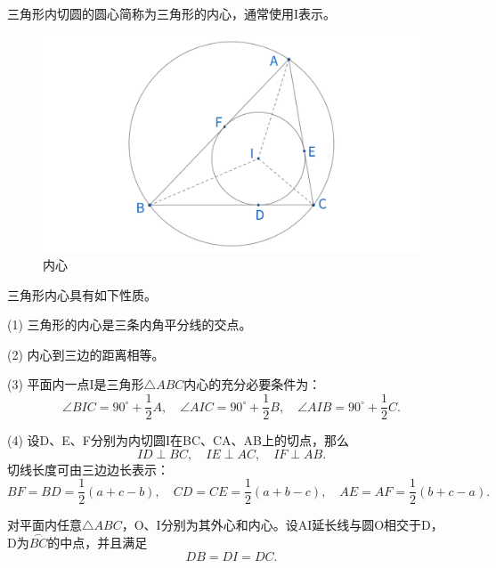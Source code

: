 \begin{definition}[内心]
    三角形内切圆的圆心简称为三角形的内心，通常使用I表示。
\end{definition}

\begin{figure}[H]
    \centering
    \includegraphics[width=0.8\linewidth]{figures/三角形五心/内心.png}
    \caption{内心}
\end{figure}

\begin{proposition}[内心性质]
    三角形内心具有如下性质。
    
    (1) 三角形的内心是三条内角平分线的交点。

    (2) 内心到三边的距离相等。

    (3) 平面内一点I是三角形$\triangle ABC$内心的充分必要条件为：
    $$\angle BIC = 90^\circ +\frac{1}{2}A,\quad \angle AIC = 90^\circ +\frac{1}{2}B,
    \quad \angle AIB =90^\circ +\frac{1}{2}C.$$

    (4) 设D、E、F分别为内切圆I在BC、CA、AB上的切点，那么
    $$
    ID \perp BC,\quad 
    IE \perp AC, \quad 
    IF \perp AB.$$
    切线长度可由三边边长表示：
    $$
    BF=BD=\frac{1}{2}(a+c - b),\quad 
    CD=CE=\frac{1}{2}(a+b - c),\quad 
    AE=AF=\frac{1}{2}(b+c - a).
    $$
\end{proposition}


\newpage 
\begin{theorem}[鸡爪定理]
    对平面内任意$\triangle ABC$，O、I分别为其外心和内心。设AI延长线与圆O相交于D，
    D为$\overset{{\frown}}{BC}$的中点，并且满足
    $$DB=DI=DC.$$
\end{theorem}

